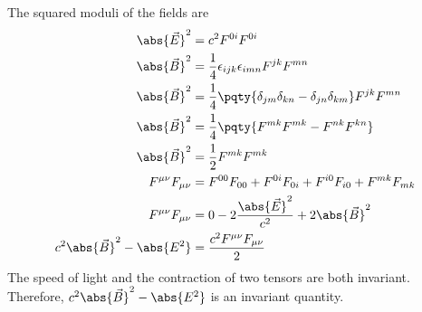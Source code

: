 \documentclass[12pt]{article}
\begin{document}
        \subsubsection{} The squared moduli of the fields are \begin{align*}
            \abs{\vec E}^2 &= c^2 F^{0i} F^{0i}\\
            \abs{\vec B}^2 &= \frac{1}{4} \epsilon_{ijk} \epsilon_{imn} F^{jk} F^{mn}\\
            \abs{\vec B}^2 &= \frac{1}{4} \pqty{\delta_{jm}\delta_{kn} - \delta_{jn}\delta_{km}} F^{jk} F^{mn}\\
            \abs{\vec B}^2 &= \frac{1}{4} \pqty{ F^{mk} F^{mk}   - F^{nk} F^{kn}}\\
            \abs{\vec B}^2 &= \frac{1}{2}F^{mk} F^{mk}\\
            F^{\mu\nu} F_{\mu\nu} &= F^{00}F_{00} + F^{0i}F_{0i} + F^{i 0}F_{i 0} + F^{mk} F_{mk}\\
            F^{\mu\nu} F_{\mu\nu} &= 0 - 2\frac{\abs{\vec E}^2}{c^2}  + 2\abs{\vec B}^2\\
            c^2 \abs{\vec B}^2 - \abs{E^2} &= \frac{c^2 F^{\mu\nu}F_{\mu\nu}}{2}
        \end{align*}
        The speed of light and the contraction of two tensors are both invariant. Therefore, \(c^2 \abs{\vec B}^2 - \abs{E^2}\) is an invariant quantity.
\end{document}
